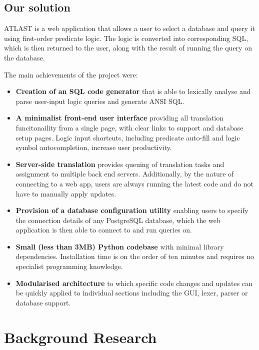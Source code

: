 \documentclass[a4paper, 11pt]{article}
\begin{document}
  \subsection{Our solution}
    ATLAST is a web application that allows a user to select a database
    and query it using first-order predicate logic. The logic is converted
    into corresponding SQL, which is then returned to the user, along with the
    result of running the query on the database.

    The main achievements of the project were:

    \begin{itemize}
      \item \textbf{Creation of an SQL code generator} that is able to lexically
      analyse and parse user-input logic queries and generate ANSI SQL.

      \item \textbf{A minimalist front-end user interface} providing all
      translation funcitonaility from a single page, with clear links to
      support and database setup pages. Logic input shortcuts, including
      predicate auto-fill and logic symbol autocompletion, increase user
      productivity.

      \item \textbf{Server-side translation} provides queuing of translation
      tasks and assignment to multiple back end servers. Additionally, by the
      nature of connecting to a web app, users are always running the latest
      code and do not have to manually apply updates.

      \item \textbf{Provision of a database configuration utility} enabling
      users to specify the connection details of any PostgreSQL database, which
      the web application is then able to connect to and run queries on.

      \item \textbf{Small (less than 3MB) Python codebase} with minimal
      library dependencies. Installation time is on the order of ten minutes
      and requires no specialist programming knowledge.

      \item \textbf{Modularised architecture} to which specific code changes
      and updates can be quickly applied to individual sections including the
      GUI, lexer, parser or database support.
    \end{itemize}

\section{Background Research}
  \label{sec:background}
\end{document}
